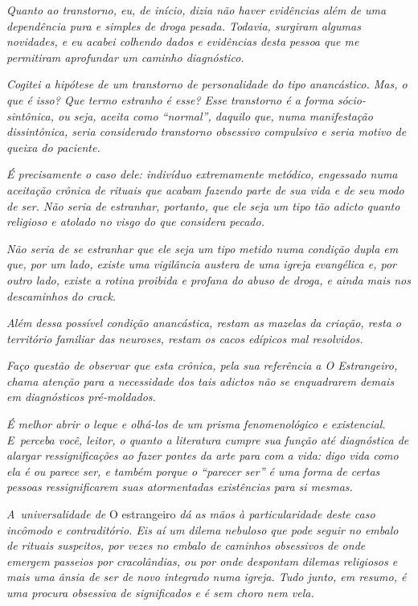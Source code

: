 \emph{Quanto ao transtorno, eu, de início, dizia não haver evidências
além de uma dependência pura e simples de droga pesada. Todavia,
surgiram algumas novidades, e eu acabei colhendo dados e evidências
desta pessoa que me permitiram aprofundar um caminho diagnóstico.}

\emph{Cogitei a hipótese de um transtorno de personalidade do tipo
anancástico. Mas, o que é isso? Que termo estranho é esse? Esse
transtorno é a forma sócio-sintônica, ou seja, aceita como ``normal'',
daquilo que, numa manifestação dissintônica, seria considerado
transtorno obsessivo compulsivo e seria motivo de queixa do paciente.}

\emph{É precisamente o caso dele: indivíduo extremamente metódico,
engessado numa aceitação crônica de rituais que acabam fazendo parte de
sua vida e de seu modo de ser. Não seria de estranhar, portanto, que ele
seja um tipo tão adicto quanto religioso e atolado no visgo do que
considera pecado.}

\emph{Não seria de se estranhar que ele seja um tipo metido numa
condição dupla em que, por um lado, existe uma vigilância austera de uma
igreja evangélica e, por outro lado, existe a rotina proibida e profana
do abuso de droga, e ainda mais nos descaminhos do crack.}

\emph{Além dessa possível condição anancástica, restam as mazelas da
criação, resta o território familiar das neuroses, restam os cacos
edípicos mal resolvidos.}

\emph{Faço questão de observar que esta crônica, pela sua referência a \emph{O
Estrangeiro}, chama atenção para a necessidade dos tais adictos não se
enquadrarem demais em diagnósticos pré-moldados.}

\emph{É melhor abrir o leque e olhá-los de um prisma fenomenológico e
existencial. E~perceba você, leitor, o quanto a literatura cumpre sua
função até diagnóstica de alargar ressignificações ao fazer pontes da
arte para com a vida: digo vida como ela é ou parece ser, e também
porque o ``parecer ser'' é uma forma de certas pessoas ressignificarem
suas atormentadas existências para si mesmas.}

\emph{A~universalidade de} O estrangeiro \emph{dá as mãos à particularidade
deste caso incômodo e contraditório. Eis aí um dilema nebuloso que pode
seguir no embalo de rituais suspeitos, por vezes no embalo de caminhos
obsessivos de onde emergem passeios por cracolândias, ou por onde
despontam dilemas religiosos e mais uma ânsia de ser de novo integrado
numa igreja. Tudo junto, em resumo, é uma procura obsessiva de
significados e é sem choro nem vela.}
\endgroup